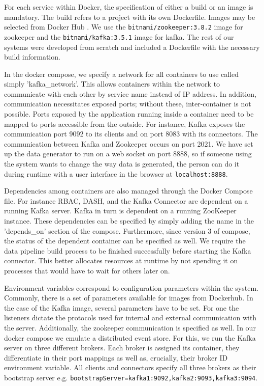 For each service within Docker, the specification of either a build or an image is mandatory. The build refers to a project with its own Dockerfile. Images may be selected from Docker Hub \cite{dockerhub}. We use the \texttt{bitnami/zookeeper:3.8.2} image for zookeeper and the \texttt{bitnami/kafka:3.5.1} image for kafka. The rest of our systems were developed from scratch and included a Dockerfile with the necessary build information. \par
In the docker compose, we specify a network for all containers to use called simply 'kafka\_network'. This allows containers within the network to communicate with each other by service name instead of IP address. In addition, communication necessitates exposed ports; without these, inter-container is not possible. Ports exposed by the application running inside a container need to be mapped to ports accessible from the outside. For instance, Kafka exposes the communication port 9092 to its clients and on port 8083 with its connectors. The communication between Kafka and Zookeeper occurs on port 2021. We have set up the data generator to run on a web socket on port 8888, so if someone using the system wants to change the way data is generated, the person can do it during runtime with a user interface in the browser at \texttt{localhost:8888}. \par
Dependencies among containers are also managed through the Docker Compose file. For instance \ac{RBAC}, \ac{DASH}, and the Kafka Connector are dependent on a running Kafka server. Kafka in turn is dependent on a running ZooKeeper instance. These dependencies can be specified by simply adding the name in the 'depends\_on' section of the compose. Furthermore, since version 3 of compose, the status of the dependent container can be specified as well. We require the data pipeline build process to be finished successfully before starting the Kafka connector. This better allocates resources at runtime by not spending it on processes that would have to wait for others later on. \par
Environment variables correspond to configuration parameters within the system. Commonly, there is a set of parameters available for images from Dockerhub. In the case of the Kafka image, several parameters have to be set. For one the listeners dictate the protocols used for internal and external communication with the server. Additionally, the zookeeper communication is specified as well. In our docker compose we emulate a distributed event store. For this, we run the Kafka server on three different brokers. Each broker is assigned its container, they differentiate in their port mappings as well as, crucially, their broker ID environment variable. All clients and connectors specify all three brokers as their bootstrap server e.g. \texttt{bootstrapServer=kafka1:9092,kafka2:9093,kafka3:9094}. \par
